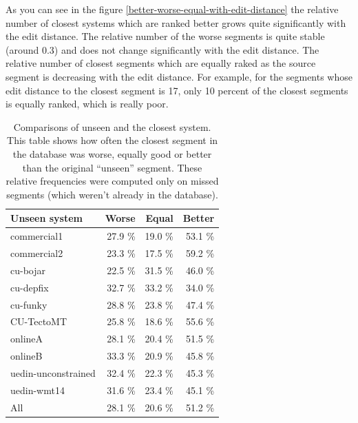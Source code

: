 As you can see in the figure \ref{better-worse-equal-with-edit-distance} the
relative number of closest systems which are ranked better grows quite
significantly with the edit distance. The relative number of the worse segments
is quite stable (around 0.3) and does not change significantly with the edit
distance. The relative number of closest segments which are equally raked as
the source segment is decreasing with the edit distance. For example, for the
segments whose edit distance to the closest segment is 17, only 10 percent of
the closest segments is equally ranked, which is really poor. 


\begin{table}
  \centering
\begin{tabular}{|lrrr|}
  \hline
  \textbf{Unseen system}            &   \textbf{Worse} &   \textbf{Equal} &   \textbf{Better} \\
  \hline
   commercial1         &   27.9 \% &   19.0 \% &    53.1 \% \\
   commercial2         &   23.3 \% &   17.5 \% &    59.2 \% \\
   cu-bojar            &   22.5 \% &   31.5 \% &    46.0 \% \\
   cu-depfix           &   32.7 \% &   33.2 \% &    34.0 \% \\
   cu-funky            &   28.8 \% &   23.8 \% &    47.4 \% \\
   CU-TectoMT          &   25.8 \% &   18.6 \% &    55.6 \% \\
   onlineA             &   28.1 \% &   20.4 \% &    51.5 \% \\
   onlineB             &   33.3 \% &   20.9 \% &    45.8 \% \\
   uedin-unconstrained &   32.4 \% &   22.3 \% &    45.3 \% \\
   uedin-wmt14         &   31.6 \% &   23.4 \% &    45.1 \% \\
  \hline
   All               &   28.1 \% &   20.6 \% &    51.2 \% \\
  \hline
\end{tabular}

\caption[Comparisons of unseen and the closest systems]{Comparisons of unseen
and the closest system. This table shows how often the closest segment in the
database was worse, equally good or better than the original ``unseen''
segment. These relative frequencies were computed only on missed segments
(which weren't already in the database).}

  \label{edit-distance-matching-analysis}
\end{table}

